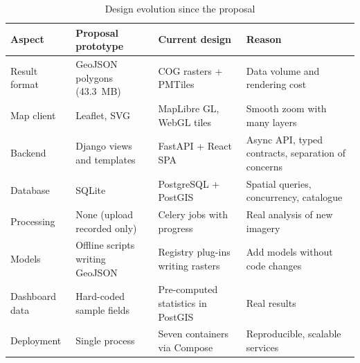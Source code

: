 \documentclass[11pt,a4paper]{article}
\begin{document}
\begin{table}[H]
\centering\small
\caption{Design evolution since the proposal}
\label{tab:evolution}
\begin{tabularx}{\textwidth}{L{2.6cm} L{3.6cm} L{4.0cm} Y}
\toprule
\textbf{Aspect} & \textbf{Proposal prototype} & \textbf{Current design} & \textbf{Reason}\\
\midrule
Result format & GeoJSON polygons (43.3~MB) & COG rasters + PMTiles & Data volume and rendering cost\\
Map client & Leaflet, SVG & MapLibre GL, WebGL tiles & Smooth zoom with many layers\\
Backend & Django views and templates & FastAPI + React SPA & Async API, typed contracts, separation of concerns\\
Database & SQLite & PostgreSQL + PostGIS & Spatial queries, concurrency, catalogue\\
Processing & None (upload recorded only) & Celery jobs with progress & Real analysis of new imagery\\
Models & Offline scripts writing GeoJSON & Registry plug-ins writing rasters & Add models without code changes\\
Dashboard data & Hard-coded sample fields & Pre-computed statistics in PostGIS & Real results\\
Deployment & Single process & Seven containers via Compose & Reproducible, scalable services\\
\bottomrule
\end{tabularx}
\end{table}
\end{document}
